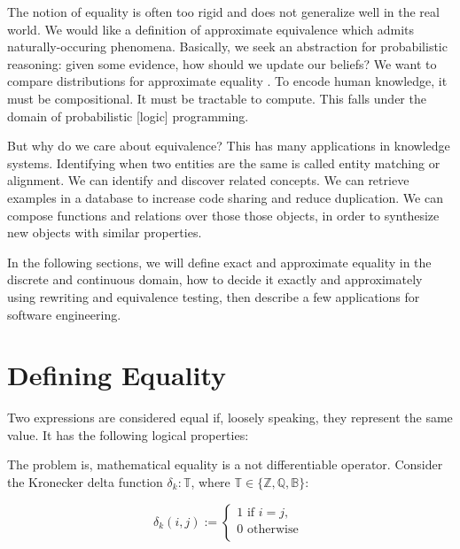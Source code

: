 \documentclass[11pt]{article}
\begin{document}
    The notion of equality is often too rigid and does not generalize well in the real world. We would like a definition of approximate equivalence which admits naturally-occuring phenomena. Basically, we seek an abstraction for probabilistic reasoning: given some evidence, how should we update our beliefs? We want to compare distributions for approximate equality . To encode human knowledge, it must be compositional. It must be tractable to compute. This falls under the domain of probabilistic [logic] programming.

    But why do we care about equivalence? This has many applications in knowledge systems. Identifying when two entities are the same is called entity matching or alignment. We can identify and discover related concepts. We can retrieve examples in a database to increase code sharing and reduce duplication. We can compose functions and relations over those those objects, in order to synthesize new objects with similar properties.

    In the following sections, we will define exact and approximate equality in the discrete and continuous domain, how to decide it exactly and approximately using rewriting and equivalence testing, then describe a few applications for software engineering.

    \pagebreak

    \section{Defining Equality}

    Two expressions are considered equal if, loosely speaking, they represent the same value. It has the following logical properties:


    The problem is, mathematical equality is a not differentiable operator. Consider the Kronecker delta function $\delta_k: \mathbb{T}$, where $\mathbb{T} \in \{\mathbb{Z, Q, B}\}$:

    $$
    \delta_k(i, j) :=
    \begin{cases}
        1 \text{ if } i = j, \\
        0 \text{ otherwise }\\
    \end{cases}
    $$
\end{document}
